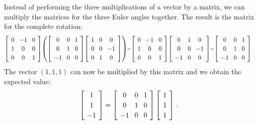 \documentclass[11pt,a4paper]{report}
\newcommand*{\spacearray}{
\renewcommand{\arraystretch}{1.2}
\setlength{\arraycolsep}{4pt}
}
\begin{document}
Instead of performing the three multiplications of a vector by a matrix, we can multiply the matrices for the three Euler angles together. The result is the matrix for the complete rotation:
\[
\spacearray
\begin{scriptstyle}
\left[\begin{array}{ccc}0&-1&0\\1&0&0\\0&0&1\\\end{array}\right]
\left(
\left[\begin{array}{ccc}0&0&1\\0&1&0\\-1&0&0\\\end{array}\right]
\left[\begin{array}{ccc}1&0&0\\0&0&-1\\0&1&0\\\end{array}\right]
\right)
=
\left[\begin{array}{ccc}0&-1&0\\1&0&0\\0&0&1\\\end{array}\right]
\left[\begin{array}{ccc}0&1&0\\0&0&-1\\-1&0&0\\\end{array}\right]
=
\left[\begin{array}{ccc}0&0&1\\0&1&0\\-1&0&0\\\end{array}\right]\,.
\end{scriptstyle}
\]
The vector $(1,1,1)$ can now be multiplied by this matrix and we obtain the expected value:
\[
\spacearray
\left[\begin{array}{c}1\\1\\-1\end{array}\right]
=
\left[\begin{array}{ccc}0&0&1\\0&1&0\\-1&0&0\\\end{array}\right]
\left[\begin{array}{c}1\\1\\1\end{array}\right]\,.
\]
\end{document}
